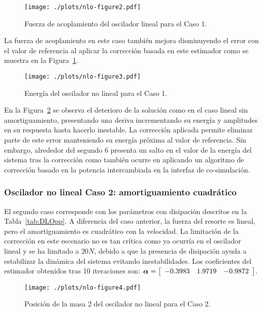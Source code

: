 \begin{figure}[ht!]\centering
	\texttt{[image: ./plots/nlo-figure2.pdf]}
	\caption{Fuerza de acoplamiento del oscilador lineal para el Caso 1.}
	\label{fig:OsciladorNoLinealFor1}
\end{figure}

La fuerza de acoplamiento en este caso también mejora disminuyendo el error con el valor de referencia al aplicar la corrección basada en este estimador como se muestra en la Figura~\ref{fig:OsciladorNoLinealFor1}.

\begin{figure}[ht!]\centering
	\texttt{[image: ./plots/nlo-figure3.pdf]}
	\caption{Energía del oscilador no lineal para el Caso 1.}
	\label{fig:OsciladorNoLinealEnergia1}
\end{figure}

En la  Figura~\ref{fig:OsciladorNoLinealEnergia1} se observa el deterioro de la solución como en el caso lineal sin amortiguamiento, presentando una deriva incrementando su energía y amplitudes en su respuesta hasta hacerlo inestable.
La corrección aplicada permite eliminar parte de este error manteniendo su energía próxima al valor de referencia.
Sin embargo, alrededor del segundo $6$ presenta un salto en el valor de la energía del sistema tras la corrección como también ocurre en \cite{Rodriguez2022} aplicando un algoritmo de corrección basado en la potencia intercambiada en la interfaz de co-simulación.



\subsubsection{Oscilador no lineal Caso 2: amortiguamiento cuadrático}
\label{subsec:res_osciladorNL2}

El segundo caso corresponde con los parámetros con disipación descritos en la Tabla~\ref{tab:DLOpp}.
A diferencia del caso anterior, la fuerza del resorte es lineal, pero el amortiguamiento es cuadrático con la velocidad.
La limitación de la corrección en este escenario no es tan crítica como ya ocurría en el oscilador lineal y se ha limitado a $20\unit{N}$, debido a que la presencia de disipación ayuda a estabilizar la dinámica del sistema evitando inestabilidades.
Los coeficientes del estimador obtenidos tras 10 iteraciones son:
$\coefficients = \sqbr{\matr{ccc}{-0.3983 & 1.9719 &-0.9872}}$.

\begin{figure}[ht!]\centering
	\texttt{[image: ./plots/nlo-figure4.pdf]}
	\caption{Posición de la masa 2 del oscilador no lineal para el Caso 2.}
	\label{fig:OsciladorNoLinealPos2}
\end{figure}

